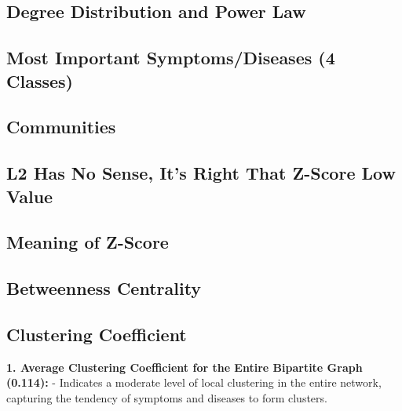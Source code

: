
\subsection{Degree Distribution and Power Law}


\subsection{Most Important Symptoms/Diseases (4 Classes)}


\subsection{Communities}


\subsection{L2 Has No Sense, It's Right That Z-Score Low Value}


\subsection{Meaning of Z-Score}


\subsection{Betweenness Centrality}


\subsection{Clustering Coefficient}
\textbf{1. Average Clustering Coefficient for the Entire Bipartite Graph (0.114):}
   - Indicates a moderate level of local clustering in the entire network, capturing the tendency of symptoms and diseases to form clusters.

